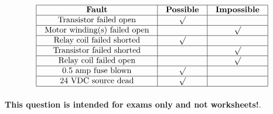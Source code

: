 \vfil 

\eject







$$\vbox{\offinterlineskip
\halign{\strut
\vrule \quad\hfil # \ \hfil & 
\vrule \quad\hfil # \ \hfil & 
\vrule \quad\hfil # \ \hfil \vrule \cr
\noalign{\hrule}
%
{\bf Fault} & {\bf Possible} & {\bf Impossible} \cr
%
\noalign{\hrule}
%
Transistor failed open & $\surd$ &  \cr
%
\noalign{\hrule}
%
Motor winding(s) failed open &  & $\surd$ \cr
%
\noalign{\hrule}
%
Relay coil failed shorted & $\surd$ &  \cr
%
\noalign{\hrule}
%
Transistor failed shorted &  & $\surd$ \cr
%
\noalign{\hrule}
%
Relay coil failed open &  & $\surd$ \cr
%
\noalign{\hrule}
%
0.5 amp fuse blown & $\surd$ &  \cr
%
\noalign{\hrule}
%
24 VDC source dead & $\surd$ &  \cr
%
\noalign{\hrule}
} %
}$$ %







{\bf This question is intended for exams only and not worksheets!}.


